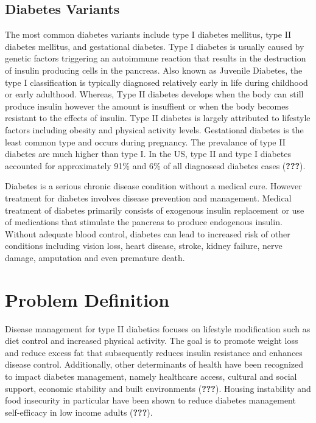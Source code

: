 \documentclass [11pt, proquest] {uwthesis}[2015/03/03]
\begin{document}
\subsection{Diabetes Variants}\label{diabetes-variants}

The most common diabetes variants include type I diabetes mellitus, type
II diabetes mellitus, and gestational diabetes. Type I diabetes is
usually caused by genetic factors triggering an autoimmune reaction that
results in the destruction of insulin producing cells in the pancreas.
Also known as Juvenile Diabetes, the type I classification is typically
diagnosed relatively early in life during childhood or early adulthood.
Whereas, Type II diabetes develops when the body can still produce
insulin however the amount is insuffient or when the body becomes
resistant to the effects of insulin. Type II diabetes is largely
attributed to lifestyle factors including obesity and physical activity
levels. Gestational diabetes is the least common type and occurs during
pregnancy. The prevalance of type II diabetes are much higher than type
I. In the US, type II and type I diabetes accounted for approximately
91\% and 6\% of all diagnosesd diabetes cases ({\textbf{???}}).

Diabetes is a serious chronic disease condition without a medical cure.
However treatment for diabetes involves disease prevention and
management. Medical treatment of diabetes primarily consists of
exogenous insulin replacement or use of medications that stimulate the
pancreas to produce endogenous insulin. Without adequate blood control,
diabetes can lead to increased risk of other conditions including vision
loss, heart disease, stroke, kidney failure, nerve damage, amputation
and even premature death.

\section{Problem Definition}\label{problem-definition}

Disease management for type II diabetics focuses on lifestyle
modification such as diet control and increased physical activity. The
goal is to promote weight loss and reduce excess fat that subsequently
reduces insulin resistance and enhances disease control. Additionally,
other determinants of health have been recognized to impact diabetes
management, namely healthcare access, cultural and social support,
economic stability and built environments ({\textbf{???}}). Housing
instability and food insecurity in particular have been shown to reduce
diabetes management self-efficacy in low income adults ({\textbf{???}}).
\end{document}
